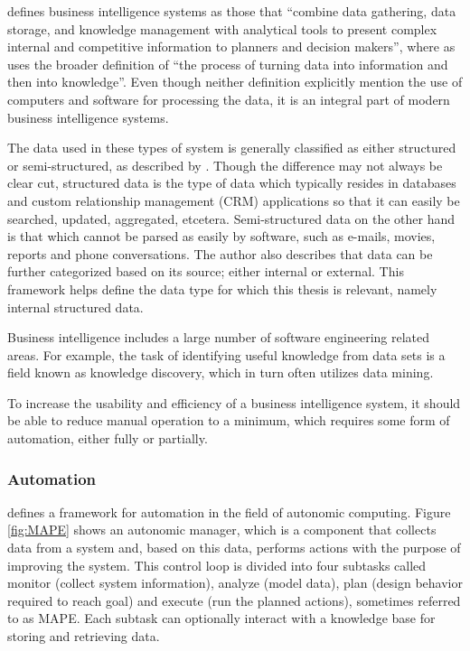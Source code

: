 \documentclass{sig-alternate}
\begin{document}
\cite{Negash2004} defines business intelligence systems as those that ``combine data gathering, data storage, and knowledge management with analytical tools to present complex internal and competitive information to planners and decision makers'', where as \cite{Golfarelli2004} uses the broader definition of ``the process of turning data into information and then into knowledge''. Even though neither definition explicitly mention the use of computers and software for processing the data, it is an integral part of modern business intelligence systems.

The data used in these types of system is generally classified as either structured or semi-structured, as described by \cite{Negash2004}. Though the difference may not always be clear cut, structured data is the type of data which typically resides in databases and custom relationship management (CRM) applications so that it can easily be searched, updated, aggregated, etcetera. Semi-structured data on the other hand is that which cannot be parsed as easily by software, such as e-mails, movies, reports and phone conversations. The author also describes that data can be further categorized based on its source; either internal or external. This framework helps define the data type for which this thesis is relevant, namely internal structured data.

Business intelligence includes a large number of software engineering related areas. For example, the task of identifying useful knowledge from data sets is a field known as knowledge discovery, which in turn often utilizes data mining.

To increase the usability and efficiency of a business intelligence system, it should be able to reduce manual operation to a minimum, which requires some form of automation, either fully or partially.

\subsubsection{Automation}
\cite{IBM2006} defines a framework for automation in the field of autonomic computing. Figure \ref{fig:MAPE} shows an autonomic manager, which is a component that collects data from a system and, based on this data, performs actions with the purpose of improving the system. This control loop is divided into four subtasks called monitor (collect system information), analyze (model data), plan (design behavior required to reach goal) and execute (run the planned actions), sometimes referred to as MAPE. Each subtask can optionally interact with a knowledge base for storing and retrieving data.
\end{document}
